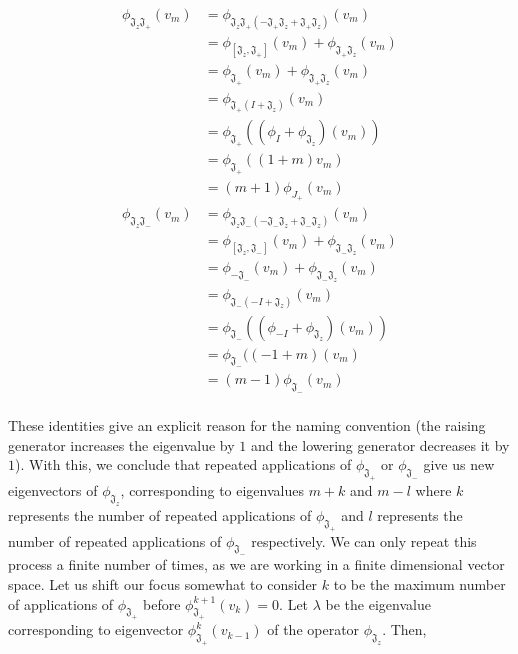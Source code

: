 \documentclass[10pt]{ucthesis}
\begin{document}
\begin{equation}
	\begin{aligned}
		\phi_{\mathfrak{J}_z\mathfrak{J}_+}(v_m) &= \phi_{\mathfrak{J}_z\mathfrak{J}_+ (-\mathfrak{J}_+\mathfrak{J}_z + \mathfrak{J}_+\mathfrak{J}_z)}(v_m) \\
					&= \phi_{[\mathfrak{J}_z,\mathfrak{J}_+]}(v_m) + \phi_{\mathfrak{J}_+\mathfrak{J}_z}(v_m) \\
					&= \phi_{\mathfrak{J}_+}(v_m) + \phi_{\mathfrak{J}_+\mathfrak{J}_z}(v_m) \\
					&= \phi_{\mathfrak{J}_+(I + \mathfrak{J}_z)}(v_m) \\					
					&= \phi_{\mathfrak{J}_+}((\phi_{I} + \phi_{\mathfrak{J}_z})(v_m)) \\
					&= \phi_{\mathfrak{J}_+}  ((1+m)v_m) \\
					&= (m + 1)\phi_{J_+}(v_m)
	\end{aligned}
\end{equation} 
\begin{equation}
	\begin{aligned}
		\phi_{\mathfrak{J}_z\mathfrak{J}_-}(v_m) &= \phi_{\mathfrak{J}_z\mathfrak{J}_- (-\mathfrak{J}_-\mathfrak{J}_z + \mathfrak{J}_-\mathfrak{J}_z)}(v_m) \\
&=\phi_{[\mathfrak{J}_z,\mathfrak{J}_- ]}(v_m) + \phi_{\mathfrak{J}_-\mathfrak{J}_z}(v_m)\\
					&= \phi_{-\mathfrak{J}_-}(v_m) + \phi_{\mathfrak{J}_-\mathfrak{J}_z}(v_m)\\
					&= \phi_{\mathfrak{J}_-(-I + \mathfrak{J}_z)}(v_m) \\
					&= \phi_{\mathfrak{J}_-}((\phi_{-I} + \phi_{\mathfrak{J}_z})(v_m)) \\
					&= \phi_{\mathfrak{J}_-} ((-1+m)(v_m) \\
					&= (m - 1)\phi_{\mathfrak{J}_-}(v_m)\\
	\end{aligned}
\end{equation} 

These identities give an explicit reason for the naming convention (the raising generator increases the eigenvalue by $1$ and the lowering generator decreases it by $1$). With this, we conclude that repeated applications of $\phi_{\mathfrak{J}_+}$ or $\phi_{\mathfrak{J}_-}$ give us new eigenvectors of $\phi_{\mathfrak{J}_z}$, corresponding to eigenvalues $m + k$ and $m-l$ where $k$ represents the number of repeated applications of $\phi_{\mathfrak{J}_+}$ and $l$ represents the number of repeated applications of $\phi_{\mathfrak{J}_-}$ respectively. We can only repeat this process a finite number of times, as we are working in a finite dimensional vector space. Let us shift our focus somewhat to consider $k$ to be the maximum number of applications of $\phi_{\mathfrak{J}_+}$ before $\phi_{\mathfrak{J}_+}^{k+1}(v_k) = 0$. Let $\lambda$ be the eigenvalue corresponding to eigenvector $\phi_{\mathfrak{J}_+}^{k}(v_{k-1})$ of the operator $\phi_{\mathfrak{J}_z}$. Then, 
\end{document}

